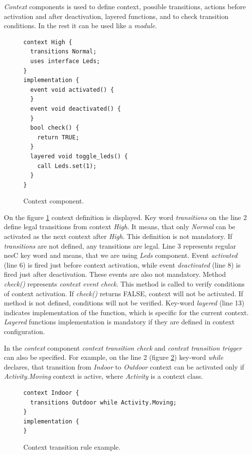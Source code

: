 \documentclass{ubicomp-ext}
\begin{document}
\textit{Context} components is used to define context, possible transitions, actions before activation and after deactivation, layered functions, and to check transition conditions. In the rest it can be used like a \textit{module}.

\begin{figure}
\begin{lstlisting}
context High {
  transitions Normal;
  uses interface Leds;
}
implementation {
  event void activated() {
  }
  event void deactivated() {
  }
  bool check() {
    return TRUE;
  }
  layered void toggle_leds() {
    call Leds.set(1);
  }
}
\end{lstlisting}
\caption{Context component.}
\label{fig:cc}
\end{figure}

On the figure \ref{fig:cc} context definition is displayed. Key word \textit{transitions} on the line 2 define legal transitions from context \textit{High}. It means, that only \textit{Normal} can be activated as the next context after \textit{High}. This definition is not mandatory. If \textit{transitions} are not defined, any transitions are legal. Line 3 represents regular nesC key word and means, that we are using \textit{Leds} component. Event \textit{activated} (line 6) is fired just before context activation, while event \textit{deactivated} (line 8) is fired just after deactivation. These events are also not mandatory. Method \textit{check()} represents \textit{context event check}. This method is called to verify conditions of context activation. If \textit{check()} returns FALSE, context will not be activated. If method is not defined, conditions will not be verified. Key-word \textit{layered} (line 13) indicates implementation of the function, which is specific for the current context. \textit{Layered} functions implementation is mandatory if they are defined in context configuration.

In the \textit{context} component \textit{context transition check} and \textit{context transition trigger} can also be specified. For example, on the line 2 (figure \ref{fig:ctre}) key-word \textit{while} declares, that transition from \textit{Indoor} to \textit{Outdoor} context can be activated only if \textit{Activity.Moving} context is active, where \textit{Activity} is a context class.

\begin{figure}
\begin{lstlisting}
context Indoor {
  transitions Outdoor while Activity.Moving;
}
implementation {
}
\end{lstlisting}
\caption{Context transition rule example.}
\label{fig:ctre}
\end{figure}
\end{document}
